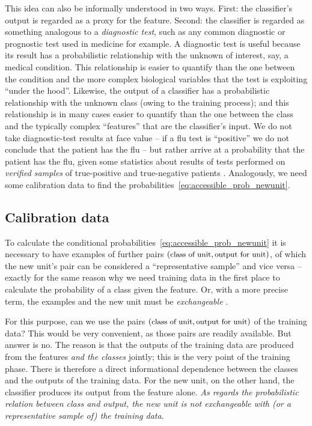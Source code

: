 \documentclass[\ifafour a4paper,12pt,\else a5paper,10pt,\fi%
onecolumn,oneside,article,%
british%
]{memoir}
\theoremstyle{remark}
\theoremstyle{innote}
\renewcommand*{\|}[1][]{\nonscript\:#1\vert\nonscript\:\mathopen{}}
\newcommand*{\chap}{ch.}%
\newcommand*{\texts}[1]{\text{\small #1}}
\begin{document}
This idea can also be informally understood in two ways. First: the classifier's output is regarded as a proxy for the feature. Second: the classifier is regarded as something analogous to a \emph{diagnostic test}, such as any common diagnostic or prognostic test used in medicine for example. A diagnostic test is useful because its result has a probabilistic relationship with the unknown of interest, say, a medical condition. This relationship is easier to quantify than the one between the condition and the more complex biological variables that the test is exploiting \enquote{under the hood}. Likewise, the output of a classifier has a probabilistic relationship with the unknown class (owing to the training process); and this relationship is in many cases easier to quantify than the one between the class and the typically complex \enquote{features} that are the classifier's input. We do not take diagnostic-test results at face value -- if a flu test is \enquote{positive} we do not conclude that the patient has the flu -- but rather arrive at a probability that the patient has the flu, given some statistics about results of tests performed on \emph{verified samples} of true-positive and true-negative patients \autocites[\chap~5]{soxetal1988_r2013}[\chap~5]{huninketal2001_r2014}[see also][]{jennyetal2018}. Analogously, we need some calibration data to find the probabilities~\eqref{eq:accessible_prob_newunit}.


\subsection{Calibration data}
\label{sec:calibration_data}

To calculate the conditional probabilities~\eqref{eq:accessible_prob_newunit} it is necessary to have examples of further pairs $(\texts{class of unit}, \texts{output for unit})$, of which the new unit's pair can be considered a \enquote{representative sample} \autocites[for a critical analysis of the sometimes hollow term \enquote{representative sample} see][]{kruskaletal1979,kruskaletal1979b,kruskaletal1979c,kruskaletal1980} and vice versa -- exactly for the same reason why we need training data in the first place to calculate the probability of a class given the feature. Or, with a more precise term, the examples and the new unit must be \emph{exchangeable} \autocites{lindleyetal1981}.

For this purpose, can we use the pairs $(\texts{class of unit}, \texts{output for unit})$ of the training data? This would be very convenient, as those pairs are readily available. But answer is no. The reason is that the outputs of the training data are produced from the features \emph{and the classes} jointly; this is the very point of the training phase. There is therefore a direct informational dependence between the classes and the outputs of the training data. For the new unit, on the other hand, the classifier produces its output from the feature alone. \emph{As regards the probabilistic relation between class and output, the new unit is not exchangeable with (or a representative sample of) the training data}.
\end{document}
